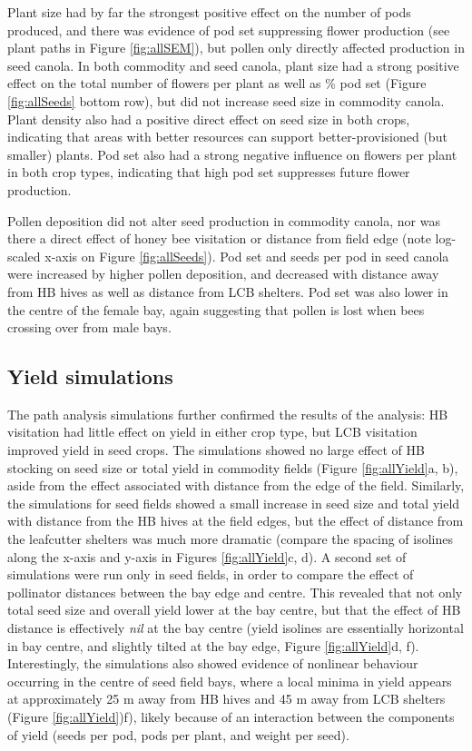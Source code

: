 \documentclass[12pt]{article} %
\begin{document}
Plant size had by far the strongest positive effect on the number of pods produced, and there was evidence of pod set suppressing flower production (see plant paths in Figure \ref{fig:allSEM}), but pollen only directly affected production in seed canola.
In both commodity and seed canola, plant size had a strong positive effect on the total number of flowers per plant as well as \% pod set (Figure \ref{fig:allSeeds} bottom row), but did not increase seed size in commodity canola.
Plant density also had a positive direct effect on seed size in both crops, indicating that areas with better resources can support better-provisioned (but smaller) plants.
Pod set also had a strong negative influence on flowers per plant in both crop types, indicating that high pod set suppresses future flower production.

Pollen deposition did not alter seed production in commodity canola, nor was there a direct effect of honey bee visitation or distance from field edge (note log-scaled x-axis on Figure \ref{fig:allSeeds}).
Pod set and seeds per pod in seed canola were increased by higher pollen deposition, and decreased with distance away from HB hives as well as distance from LCB shelters.
Pod set was also lower in the centre of the female bay, again suggesting that pollen is lost when bees crossing over from male bays.

\subsection*{Yield simulations}

The path analysis simulations further confirmed the results of the analysis: HB visitation had little effect on yield in either crop type, but LCB visitation improved yield in seed crops.
The simulations showed no large effect of HB stocking on seed size or total yield in commodity fields (Figure \ref{fig:allYield}a, b), aside from the effect associated with distance from the edge of the field.
Similarly, the simulations for seed fields showed a small increase in seed size and total yield with distance from the HB hives at the field edges, but the effect of distance from the leafcutter shelters was much more dramatic (compare the spacing of isolines along the x-axis and y-axis in Figures \ref{fig:allYield}c, d).
A second set of simulations were run only in seed fields, in order to compare the effect of pollinator distances between the bay edge and centre. 
This revealed that not only total seed size and overall yield lower at the bay centre, but that the effect of HB distance is effectively \emph{nil} at the bay centre (yield isolines are essentially horizontal in bay centre, and slightly tilted at the bay edge, Figure \ref{fig:allYield}d, f).
Interestingly, the simulations also showed evidence of nonlinear behaviour occurring in the centre of seed field bays, where a local minima in yield appears at approximately 25 m away from HB hives and 45 m away from LCB shelters (Figure \ref{fig:allYield})f), likely because of an interaction between the components of yield (seeds per pod, pods per plant, and weight per seed). 
\end{document}
